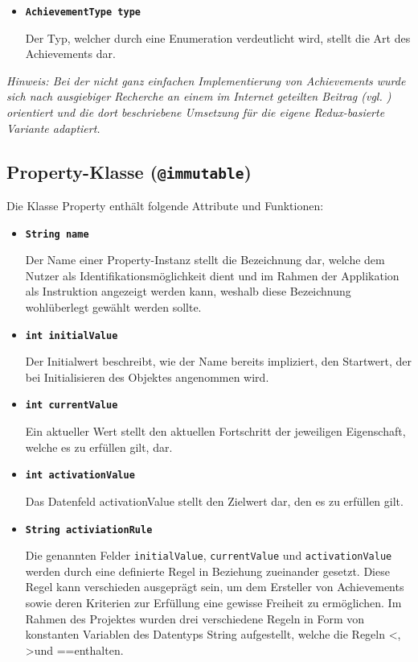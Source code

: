\documentclass[bibliography=totoc,listof=totoc,BCOR=5mm,DIV=12,oneside]{scrbook}
\begin{document}
{\begin{itemize}
\item[] \texttt{\textbf{AchievementType type}}
\par Der Typ, welcher durch eine Enumeration verdeutlicht wird, stellt die Art des Achievements dar.
\end{itemize}

\par \textit{Hinweis: Bei der nicht ganz einfachen Implementierung von Achievements wurde sich nach ausgiebiger Recherche an einem im Internet geteilten Beitrag (vgl. \citep{AchievementsImplementation}) orientiert und die dort beschriebene Umsetzung für die eigene Redux-basierte Variante adaptiert.}

\subsection{Property-Klasse (\texttt{@immutable})}
\label{sub:propertyclass}
\par \medskip Die Klasse Property enthält folgende Attribute und Funktionen:

\begin{itemize}
\item[] \texttt{\textbf{String name}}
\par Der Name einer Property-Instanz stellt die Bezeichnung dar, welche dem Nutzer als Identifikationsmöglichkeit dient und im Rahmen der Applikation als Instruktion angezeigt werden kann, weshalb diese Bezeichnung wohlüberlegt gewählt werden sollte. 

\item[] \texttt{\textbf{int initialValue}}
\par Der Initialwert beschreibt, wie der Name bereits impliziert, den Startwert, der bei Initialisieren des Objektes angenommen wird.

\item[] \texttt{\textbf{int currentValue}}
\par Ein aktueller Wert stellt den aktuellen Fortschritt der jeweiligen Eigenschaft, welche es zu erfüllen gilt, dar. 

\item[] \texttt{\textbf{int activationValue}}
\par Das Datenfeld activationValue stellt den Zielwert dar, den es zu erfüllen gilt.

\item[] \texttt{\textbf{String activiationRule}}
\par Die genannten Felder \texttt{initialValue}, \texttt{currentValue} und \texttt{activationValue} werden durch eine definierte Regel in Beziehung zueinander gesetzt. Diese Regel kann verschieden ausgeprägt sein, um dem Ersteller von Achievements sowie deren Kriterien zur Erfüllung eine gewisse Freiheit zu ermöglichen. Im Rahmen des Projektes wurden drei verschiedene Regeln in Form von konstanten Variablen des Datentyps String aufgestellt, welche die Regeln \grqq <\grqq, \grqq >\grqq und \grqq ==\grqq enthalten. 


\end{itemize}}
\end{document}
